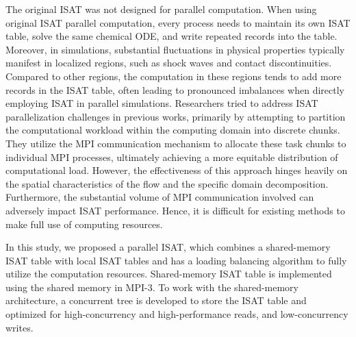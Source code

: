 The original ISAT was not designed for parallel computation. When using original ISAT parallel computation, every process needs to maintain its own ISAT table, solve the same chemical ODE, and write repeated records into the table. Moreover, in simulations, substantial fluctuations in physical properties typically manifest in localized regions, such as shock waves and contact discontinuities. Compared to other regions, the computation in these regions tends to add more records in the ISAT table, often leading to pronounced imbalances when directly employing ISAT in parallel simulations. Researchers tried to address ISAT parallelization challenges in previous works\cite{lu2009computationally,wu2018parallel}, primarily by attempting to partition the computational workload within the computing domain into discrete chunks. They utilize the MPI communication mechanism to allocate these task chunks to individual MPI processes, ultimately achieving a more equitable distribution of computational load. However, the effectiveness of this approach hinges heavily on the spatial characteristics of the flow and the specific domain decomposition. Furthermore, the substantial volume of MPI communication involved can adversely impact ISAT performance.
Hence, it is difficult for existing methods to make full use of computing resources.


In this study, we proposed a parallel ISAT, which combines a shared-memory ISAT table with local ISAT tables and has a loading balancing algorithm to fully utilize the computation resources. Shared-memory ISAT table is implemented using the shared memory in MPI-3. To work with the shared-memory architecture, a concurrent tree is developed to store the ISAT table and optimized for high-concurrency and high-performance reads, and low-concurrency writes.




